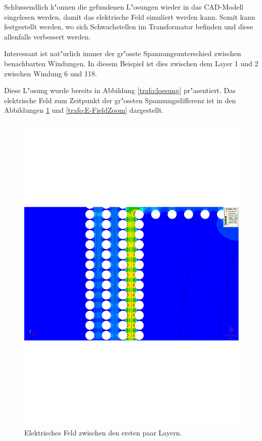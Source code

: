 \begin{refsection}
Schlussendlich k"onnen die gefundenen L"osungen wieder in das CAD-Modell eingelesen werden, damit das elektrische Feld simuliert werden kann. Somit kann festgestellt werden, wo sich Schwachstellen im Transformator befinden und diese allenfalls verbessert werden.

Interessant ist nat"urlich immer der gr"osste Spannungsunterschied zwischen benachbarten Windungen. In diesem Beispiel ist dies zwischen dem Layer 1 und 2 zwischen Windung 6 und 118.

Diese L"osung wurde bereits in Abbildung \ref{trafo:loesung} pr"asentiert. Das elektrische Feld zum Zeitpunkt der gr"ossten Spannungsdifferenz ist in den Abbildungen \ref{trafo:E-Field} und \ref{trafo:E-FieldZoom} dargestellt. 

\begin{figure}
	\centering
	\includegraphics[width=\textwidth]{./trafo/images/BIL_VoltageTrans.pdf}
	\caption{Elektrisches Feld zwischen den ersten paar Layern.}
	\label{trafo:E-Field}
\end{figure}


\end{refsection}
